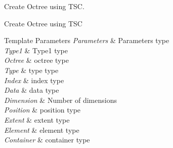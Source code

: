 Create Octree using T\-S\-C. 

Create Octree using T\-S\-C 
\begin{DoxyTemplParams}{Template Parameters}
{\em Parameters} & Parameters type \\
\hline
{\em Type1} & Type1 type \\
\hline
{\em Octree} & octree type \\
\hline
{\em Type} & type type \\
\hline
{\em Index} & index type \\
\hline
{\em Data} & data type \\
\hline
{\em Dimension} & Number of dimensions \\
\hline
{\em Position} & position type \\
\hline
{\em Extent} & extent type \\
\hline
{\em Element} & element type \\
\hline
{\em Container} & container type \\
\hline
\end{DoxyTemplParams}

